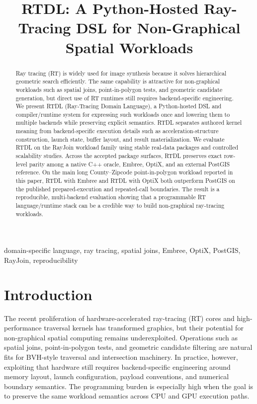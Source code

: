 \documentclass[conference]{IEEEtran}
\title{RTDL: A Python-Hosted Ray-Tracing DSL for Non-Graphical Spatial Workloads}
\author{
\IEEEauthorblockN{Rubao Lee}
\IEEEauthorblockA{\texttt{lee.rubao@ieee.org}}
}
\begin{document}
\maketitle

\begin{abstract}
Ray tracing (RT) is widely used for image synthesis because it solves
hierarchical geometric search efficiently. The same capability is attractive
for non-graphical workloads such as spatial joins, point-in-polygon tests, and
geometric candidate generation, but direct use of RT runtimes still requires
backend-specific engineering. We present RTDL (Ray-Tracing Domain Language), a
Python-hosted DSL and compiler/runtime system for expressing such workloads
once and lowering them to multiple backends while preserving explicit
semantics. RTDL separates authored kernel meaning from backend-specific
execution details such as acceleration-structure construction, launch state,
buffer layout, and result materialization. We evaluate RTDL on the RayJoin
workload family using stable real-data packages and controlled scalability
studies. Across the accepted package surfaces, RTDL preserves exact row-level
parity among a native C++ oracle, Embree, OptiX, and an external PostGIS
reference. On the main long County--Zipcode point-in-polygon workload reported
in this paper, RTDL with Embree and RTDL with OptiX both outperform PostGIS on
the published prepared-execution and repeated-call boundaries. The result is a
reproducible, multi-backend evaluation showing that a programmable RT
language/runtime stack can be a credible way to build non-graphical
ray-tracing workloads.
\end{abstract}

\begin{IEEEkeywords}
domain-specific language, ray tracing, spatial joins, Embree, OptiX, PostGIS,
RayJoin, reproducibility
\end{IEEEkeywords}

\section{Introduction}

The recent proliferation of hardware-accelerated ray-tracing (RT) cores and
high-performance traversal kernels has transformed graphics, but their
potential for non-graphical spatial computing remains underexploited.
Operations such as spatial joins, point-in-polygon tests, and geometric
candidate filtering are natural fits for BVH-style traversal and intersection
machinery. In practice, however, exploiting that hardware still requires
backend-specific engineering around memory layout, launch configuration,
payload conventions, and numerical boundary semantics. The programming burden
is especially high when the goal is to preserve the same workload semantics
across CPU and GPU execution paths.
\end{document}
